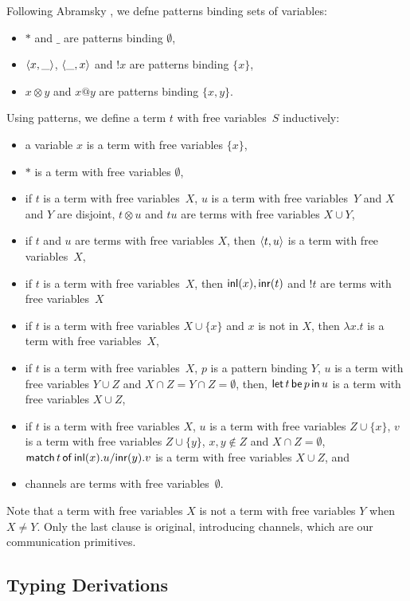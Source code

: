 Following Abramsky , we defne patterns binding sets of
variables:
\begin{itemize}
 \item $\ast$ and $\_$ are patterns binding $\emptyset$,
 \item $\langle{x,\_}\rangle$, $\langle{\_,x}\rangle$ and $!x$ are patterns binding
       $\{x\}$,
 \item $x\otimes y$ and $x@y$ are patterns binding $\{x,y\}$.
\end{itemize}
Using patterns, we define a term $t$ with free variables~$S$ inductively:
\begin{itemize}
 \item a variable $x$ is a term with free variables $\{x\}$,
 \item $\ast$ is a term with free variables $\emptyset$,
 \item if $t$ is a term with free variables~$X$, $u$ is a term with
       free variables~$Y$ and $X$ and $Y$ are disjoint, $t\otimes u$ and
       $tu$ are terms with free variables $X\cup Y$,
 \item if $t$ and $u$ are terms with free variables $X$, then
       $\langle{t,u}\rangle$ is a term with free variables~$X$,
 \item if $t$ is a term with free variables~$X$, then
       $\mathsf{inl}({x}), \mathsf{inr}({t})$ and $!t$ are terms with free variables~$X$
 \item if $t$ is a term with free variables $X\cup \{x\}$ and $x$ is not
       in $X$, then $\lambda x.t$ is a term with free variables~$X$,
 \item if $t$ is a term with free variables~$X$, $p$ is a pattern
       binding $Y$, $u$ is a term with free variables $Y\cup Z$ and
       $X\cap Z = Y\cap Z = \emptyset$, then,
       $\mathsf{let }\,{t}\,\mathsf{ be }\,{p}\,\mathsf{ in }\,{u}$ is a term with free variables $X\cup Z$,
 \item if $t$ is a term with free variables $X$,
       $u$ is a term with free variables $Z\cup \{x\}$,
       $v$ is a term with free variables $Z\cup \{y\}$,
       $x,y\notin Z$ and $X\cap Z = \emptyset$,
       $\mathsf{match}\,{t}\,\mathsf{of}\, \mathsf{inl}({x}). {u}/ \mathsf{inr}({y}). {v}$ is a term with free variables $X\cup Z$, and
 \item channels are terms with free variables~$\emptyset$.
\end{itemize}
Note that a term with free variables $X$ is not a term with free
variables $Y$ when $X\neq Y$.  Only the last clause is original,
introducing channels, which are our communication primitives.

\subsection{Typing Derivations}

